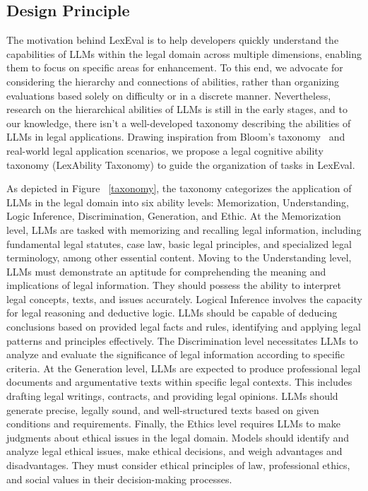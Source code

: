 \subsection{Design Principle}
The motivation behind LexEval is to help developers quickly understand the capabilities of LLMs within the legal domain across multiple dimensions, enabling them to focus on specific areas for enhancement.
To this end, we advocate for considering the hierarchy and connections of abilities, rather than organizing evaluations based solely on difficulty or in a discrete manner. Nevertheless, research on the hierarchical abilities of LLMs is still in the early stages, and to our knowledge, there isn’t a well-developed taxonomy describing the abilities of LLMs in legal applications\cite{tax}.
Drawing inspiration from Bloom's taxonomy~\cite{krathwohl2002revision} and real-world legal application scenarios, we propose a legal cognitive ability taxonomy (LexAbility Taxonomy) to guide the organization of tasks in LexEval.

As depicted in Figure ~\ref{taxonomy}, the taxonomy categorizes the application of LLMs in the legal domain into six ability levels: Memorization, Understanding, Logic Inference, Discrimination, Generation, and Ethic.
At the Memorization level, LLMs are tasked with memorizing and recalling legal information, including fundamental legal statutes, case law, basic legal principles, and specialized legal terminology, among other essential content.
Moving to the Understanding level, LLMs must demonstrate an aptitude for comprehending the meaning and implications of legal information. They should possess the ability to interpret legal concepts, texts, and issues accurately.
Logical Inference involves the capacity for legal reasoning and deductive logic. LLMs should be capable of deducing conclusions based on provided legal facts and rules, identifying and applying legal patterns and principles effectively.
The Discrimination level necessitates LLMs to analyze and evaluate the significance of legal information according to specific criteria.
At the Generation level, LLMs are expected to produce professional legal documents and argumentative texts within specific legal contexts. This includes drafting legal writings, contracts, and providing legal opinions. LLMs should generate precise, legally sound, and well-structured texts based on given conditions and requirements.
Finally, the Ethics level requires LLMs to make judgments about ethical issues in the legal domain. Models should identify and analyze legal ethical issues, make ethical decisions, and weigh advantages and disadvantages. They must consider ethical principles of law, professional ethics, and social values in their decision-making processes.

